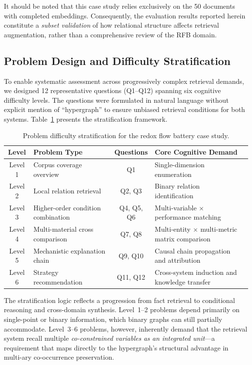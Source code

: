 \documentclass[11pt,a4paper]{article}
\begin{document}
It should be noted that this case study relies exclusively on the 50 documents with completed embeddings. Consequently, the evaluation results reported herein constitute a \emph{subset validation} of how relational structure affects retrieval augmentation, rather than a comprehensive review of the RFB domain.

\subsection{Problem Design and Difficulty Stratification}
\label{subsec:flow_battery_problems}

To enable systematic assessment across progressively complex retrieval demands, we designed 12 representative questions (Q1--Q12) spanning six cognitive difficulty levels. The questions were formulated in natural language without explicit mention of ``hypergraph'' to ensure unbiased retrieval conditions for both systems. Table~\ref{tab:difficulty_levels} presents the stratification framework.

\begin{table}[htbp]
\centering
\caption{Problem difficulty stratification for the redox flow battery case study.}
\label{tab:difficulty_levels}
\begin{tabular}{@{}clclp{4.5cm}@{}}
\toprule
\textbf{Level} & \textbf{Problem Type} & \textbf{Questions} & \textbf{Core Cognitive Demand} \\
\midrule
Level 1 & Corpus coverage overview & Q1 & Single-dimension enumeration \\
Level 2 & Local relation retrieval & Q2, Q3 & Binary relation identification \\
Level 3 & Higher-order condition combination & Q4, Q5, Q6 & Multi-variable $\times$ performance matching \\
Level 4 & Multi-material cross comparison & Q7, Q8 & Multi-entity $\times$ multi-metric matrix comparison \\
Level 5 & Mechanistic explanation chain & Q9, Q10 & Causal chain propagation and attribution \\
Level 6 & Strategy recommendation & Q11, Q12 & Cross-system induction and knowledge transfer \\
\bottomrule
\end{tabular}
\end{table}

The stratification logic reflects a progression from fact retrieval to conditional reasoning and cross-domain synthesis. Level~1--2 problems depend primarily on single-point or binary information, which binary graphs can still partially accommodate. Level~3--6 problems, however, inherently demand that the retrieval system recall multiple \emph{co-constrained variables as an integrated unit}---a requirement that maps directly to the hypergraph's structural advantage in multi-ary co-occurrence preservation.
\end{document}
